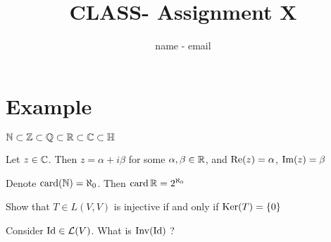 \documentclass[12pt]{article}
\title{CLASS- Assignment X} %
\author{name - email}
\begin{document}
\maketitle

\section*{Example}

\begin{theorem}{1}
$\mathbb{N} \subset \mathbb{Z} \subset \mathbb{Q} \subset \mathbb{R} \subset \mathbb{C} \subset \mathbb{H}$
\end{theorem}

\begin{exercise}{2}
    Let $z \in \mathbb{C}$. Then $z = \alpha + i\beta$ for some $\alpha, \beta \in \mathbb{R}$, 
    and $\operatorname{Re}(z) = \alpha$, $\operatorname{Im}(z) = \beta$
\end{exercise}

\begin{lemma}{3}
    Denote $\operatorname{card}(\mathbb{N})  = \aleph_0$. Then $\operatorname{card} \mathbb{R} = 2^{\aleph_0}$
\end{lemma}

\begin{problem}{4}
    Show that $T \in L(V,V)$ is injective if and only if $\operatorname{Ker}(T) = \left\{ 0 \right\}$
\end{problem}

\begin{question}{5}
    Consider $\operatorname{Id} \in \mathcal{L}(V)$. What is $\operatorname{Inv} (\operatorname{Id})$ ?
\end{question}
\end{document}
